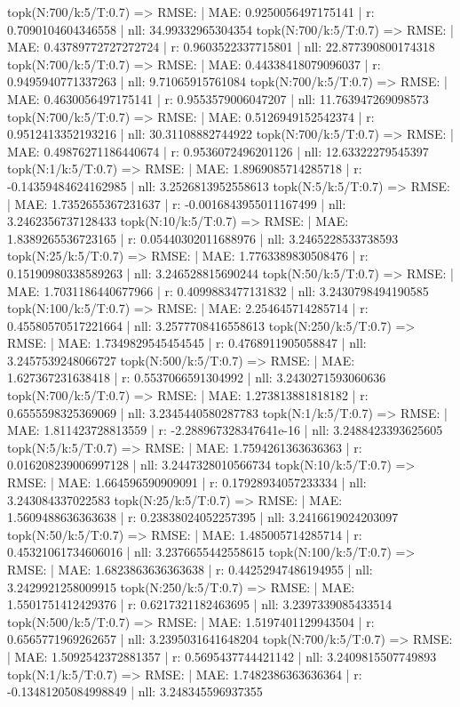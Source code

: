 topk(N:700/k:5/T:0.7) => RMSE: | MAE: 0.9250056497175141 | r: 0.7090104604346558 | nll: 34.99332965304354
topk(N:700/k:5/T:0.7) => RMSE: | MAE: 0.43789772727272724 | r: 0.9603522337715801 | nll: 22.877390800174318
topk(N:700/k:5/T:0.7) => RMSE: | MAE: 0.44338418079096037 | r: 0.9495940771337263 | nll: 9.71065915761084
topk(N:700/k:5/T:0.7) => RMSE: | MAE: 0.4630056497175141 | r: 0.9553579006047207 | nll: 11.763947269098573
topk(N:700/k:5/T:0.7) => RMSE: | MAE: 0.5126949152542374 | r: 0.9512413352193216 | nll: 30.31108882744922
topk(N:700/k:5/T:0.7) => RMSE: | MAE: 0.49876271186440674 | r: 0.9536072496201126 | nll: 12.63322279545397
topk(N:1/k:5/T:0.7) => RMSE: | MAE: 1.8969085714285718 | r: -0.14359484624162985 | nll: 3.2526813952558613
topk(N:5/k:5/T:0.7) => RMSE: | MAE: 1.7352655367231637 | r: -0.0016843955011167499 | nll: 3.2462356737128433
topk(N:10/k:5/T:0.7) => RMSE: | MAE: 1.8389265536723165 | r: 0.05440302011688976 | nll: 3.2465228533738593
topk(N:25/k:5/T:0.7) => RMSE: | MAE: 1.7763389830508476 | r: 0.15190980338589263 | nll: 3.246528815690244
topk(N:50/k:5/T:0.7) => RMSE: | MAE: 1.7031186440677966 | r: 0.4099883477131832 | nll: 3.2430798494190585
topk(N:100/k:5/T:0.7) => RMSE: | MAE: 2.254645714285714 | r: 0.45580570517221664 | nll: 3.2577708416558613
topk(N:250/k:5/T:0.7) => RMSE: | MAE: 1.7349829545454545 | r: 0.4768911905058847 | nll: 3.2457539248066727
topk(N:500/k:5/T:0.7) => RMSE: | MAE: 1.627367231638418 | r: 0.5537066591304992 | nll: 3.2430271593060636
topk(N:700/k:5/T:0.7) => RMSE: | MAE: 1.273813881818182 | r: 0.6555598325369069 | nll: 3.2345440580287783
topk(N:1/k:5/T:0.7) => RMSE: | MAE: 1.811423728813559 | r: -2.288967328347641e-16 | nll: 3.2488423393625605
topk(N:5/k:5/T:0.7) => RMSE: | MAE: 1.7594261363636363 | r: 0.016208239006997128 | nll: 3.2447328010566734
topk(N:10/k:5/T:0.7) => RMSE: | MAE: 1.664596590909091 | r: 0.17928934057233334 | nll: 3.243084337022583
topk(N:25/k:5/T:0.7) => RMSE: | MAE: 1.5609488636363638 | r: 0.23838024052257395 | nll: 3.2416619024203097
topk(N:50/k:5/T:0.7) => RMSE: | MAE: 1.485005714285714 | r: 0.45321061734606016 | nll: 3.2376655442558615
topk(N:100/k:5/T:0.7) => RMSE: | MAE: 1.6823863636363638 | r: 0.44252947486194955 | nll: 3.2429921258009915
topk(N:250/k:5/T:0.7) => RMSE: | MAE: 1.5501751412429376 | r: 0.6217321182463695 | nll: 3.2397339085433514
topk(N:500/k:5/T:0.7) => RMSE: | MAE: 1.5197401129943504 | r: 0.6565771969262657 | nll: 3.2395031641648204
topk(N:700/k:5/T:0.7) => RMSE: | MAE: 1.5092542372881357 | r: 0.5695437744421142 | nll: 3.2409815507749893
topk(N:1/k:5/T:0.7) => RMSE: | MAE: 1.7482386363636364 | r: -0.13481205084998849 | nll: 3.248345596937355
